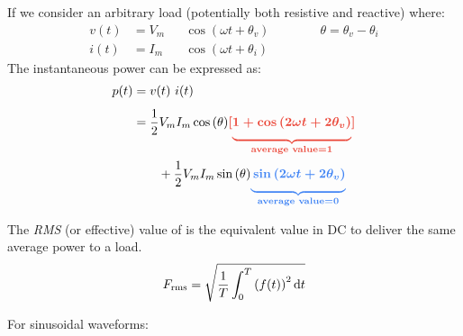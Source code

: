 \begin{multicols}{2}

    \begin{CheatsheetEntryFrame}

        
        If we consider an arbitrary load (potentially both resistive and reactive) where:
        \begin{alignat*}{2}
            v(t) &= V_m && \cos{(\omega t + \theta_v)} \qquad \qquad \theta = \theta_v - \theta_i \\
            i(t) &= I_m && \cos{(\omega t + \theta_i)}
        \end{alignat*}
        The instantaneous power can be expressed as:
        \begin{align*}
            p(t)
                &= v(t)\ i(t) \vphantom{\frac{}{2}} \\ %
                &= \frac{1}{2} V_m I_m \cos{(\theta)} \memphR{[\underbrace{\vphantom{\frac{1}{2}} 1 + \cos{(2 \omega t + 2 \theta_v)}}_{\textbf{average value} = 1}]} \\
                &\qquad + \frac{1}{2} V_m I_m \sin{(\theta)} \memphB{\underbrace{\vphantom{\frac{1}{2}} \sin{(2 \omega t + 2 \theta_v)}}_{\textbf{average value} = 0}}
        \end{align*}

    \end{CheatsheetEntryFrame}

    \begin{CheatsheetEntryFrame}


        The \textit{RMS} (or effective) value of  is the equivalent value in DC to deliver the same average power to a load.
        \begin{equation*}
            F_\text{rms} =\sqrt{\frac{1}{T} \int_0^T{\parens*{f(t)}^2 \,\diff{t}}} 
        \end{equation*}

        For sinusoidal waveforms:


\end{CheatsheetEntryFrame}
\end{multicols}
